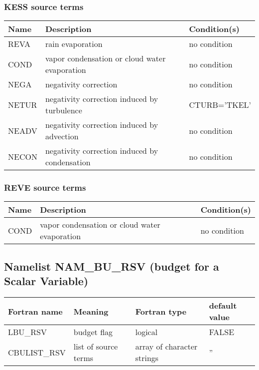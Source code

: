 \subsubsection{KESS source terms}

\begin{longtable} {|p{}|p{}|p{}|}
\hline
Name & Description & Condition(s) \\
\hline \hline
\endhead
REVA   & rain evaporation                              & no condition \\\hline
COND   & vapor condensation or cloud water evaporation & no condition \\\hline
NEGA   & negativity correction                         & no condition \\\hline
NETUR  & negativity correction induced by turbulence   & CTURB='TKEL' \\\hline
NEADV  & negativity correction induced by advection    & no condition \\\hline
NECON  & negativity correction induced by condensation & no condition \\\hline
\end{longtable}

\subsubsection{REVE source terms}

\begin{longtable} {|p{}|p{}|p{}|}
\hline
Name & Description & Condition(s) \\
\hline \hline
\endhead
COND   & vapor condensation or cloud water evaporation & no condition \\\hline
\end{longtable}


\subsection{Namelist NAM\_BU\_RSV (budget for a Scalar Variable)}

\begin{longtable} {|p{}|p{}|>{\centering}p{}|p{}<{\centering}|}
\hline
Fortran name & Meaning & Fortran type & default value \\
\hline \hline
\endhead
LBU\_RSV & budget flag & logical & FALSE\index{LBU\_RSV!\innam{NAM\_BU\_RSV}} \\\hline
CBULIST\_RSV & list of source terms & array of character strings & ''\index{CBULIST\_RSV!\innam{NAM\_BU\_RSV}} \\\hline
\end{longtable}

